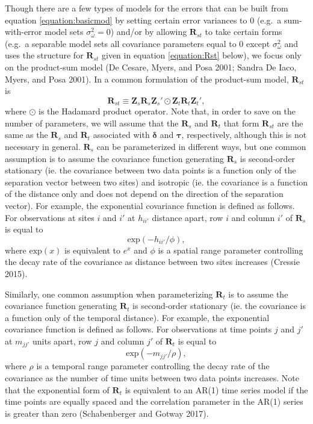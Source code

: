 \documentclass[smallextended]{svjour3}       %
\begin{document}
Though there are a few types of models for the errors that can be built
from equation \ref{equation:basicmod} by setting certain error variances
to 0 (e.g.~a sum-with-error model sets \(\sigma^2_{\omega} = 0\)) and/or
by allowing \(\mathbf{R}_{st}\) to take certain forms (e.g.~a separable
model sets all covariance parameters equal to \(0\) except
\(\sigma^2_{\omega}\) and uses the structure for \(\mathbf{R}_{st}\)
given in equation \ref{equation:Rst} below), we focus only on the
product-sum model (De Cesare, Myers, and Posa 2001; Sandra De Iaco,
Myers, and Posa 2001). In a common formulation of the product-sum model,
\(\mathbf{R}_{st}\) is \mbox{} \begin{equation}
\label{equation:Rst}
\mathbf{R}_{st} \equiv \mathbf{Z}_{s} \mathbf{R}_{s} \mathbf{Z}_{s}' \odot \mathbf{Z}_t \mathbf{R}_t \mathbf{Z}_t',
\end{equation} \noindent where \(\odot\) is the Hadamard product
operator. Note that, in order to save on the number of parameters, we
will assume that the \(\mathbf{R}_s\) and \(\mathbf{R}_t\) that form
\(\mathbf{R}_{st}\) are the same as the \(\mathbf{R}_s\) and
\(\mathbf{R}_t\) associated with \(\bm{\delta}\) and \(\bm{\tau}\),
respectively, although this is not necessary in general.
\(\mathbf{R}_s\) can be parameterized in different ways, but one common
assumption is to assume the covariance function generating
\(\mathbf{R}_s\) is second-order stationary (ie. the covariance between
two data points is a function only of the separation vector between two
sites) and isotropic (ie. the covariance is a function of the distance
only and does not depend on the direction of the separation vector). For
example, the exponential covariance function is defined as follows. For
observations at sites \(i\) and \(i'\) at \(h_{ii'}\) distance apart,
row \(i\) and column \(i'\) of \(\mathbf{R}_{s}\) is equal to \mbox{}
\begin{equation}
\label{equation:spatcov}
\text{exp}(-h_{ii'} / \phi),
\end{equation} \noindent where \(\text{exp}(x)\) is equivalent to
\(e^x\) and \(\phi\) is a spatial range parameter controlling the decay
rate of the covariance as distance between two sites increases (Cressie
2015).

Similarly, one common assumption when parameterizing \(\mathbf{R}_t\) is
to assume the covariance function generating \(\mathbf{R}_t\) is
second-order stationary (ie. the covariance is a function only of the
temporal distance). For example, the exponential covariance function is
defined as follows. For observations at time points \(j\) and \(j'\) at
\(m_{jj'}\) units apart, row \(j\) and column \(j'\) of
\(\mathbf{R}_{t}\) is equal to \mbox{} \begin{equation}
\label{equation:tempcov}
\text{exp}(-m_{jj'} / \rho),
\end{equation} \noindent where \(\rho\) is a temporal range parameter
controlling the decay rate of the covariance as the number of time units
between two data points increases. Note that the exponential form of
\(\mathbf{R}_t\) is equivalent to an AR(1) time series model if the time
points are equally spaced and the correlation parameter in the AR(1)
series is greater than zero (Schabenberger and Gotway 2017).
\end{document}
